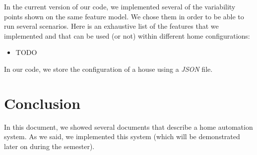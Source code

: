 		In the current version of our code, we implemented several of the variability points shown on the same feature model. We chose them in order to be able to run several scenarios.
		Here is an exhaustive list of the features that we implemented and that can be used (or not) within different home configurations:
		\begin{itemize}
			\item TODO
		\end{itemize}
		
		In our code, we store the configuration of a house using a \textit{JSON} file.
	
	\section{Conclusion}
		In this document, we showed several documents that describe a home automation system.
		As we said, we implemented this system (which will be demonstrated later on during the semester).


